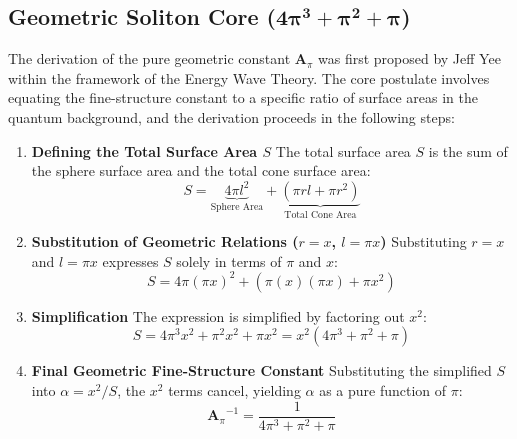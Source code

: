 \documentclass[10pt,a4paper]{article}
\begin{document}
\subsection*{Geometric Soliton Core ($\mathbf{4\pi^{3} + \pi^{2} + \pi}$)}

The derivation of the pure geometric constant $\mathbf{A}_{\pi}$ was first proposed by Jeff Yee \cite{Yee2019alfa} within the framework of the Energy Wave Theory. The core postulate involves equating the fine-structure constant to a specific ratio of surface areas in the quantum background, and the derivation proceeds in the following steps:
\begin{enumerate}[label=\textbf{Step \arabic*:}]
	\item \textbf{Defining the Total Surface Area $S$}
	The total surface area $S$ is the sum of the sphere surface area and the total cone surface area:
	\begin{equation}
		S = \underbrace{4\pi l^{2}}_{\text{Sphere Area}} + \underbrace{(\pi r l + \pi r^{2})}_{\text{Total Cone Area}}
	\end{equation}
	
	\item \textbf{Substitution of Geometric Relations ($r=x$, $l=\pi x$)}
	Substituting $r=x$ and $l=\pi x$ expresses $S$ solely in terms of $\pi$ and $x$:
	\begin{equation}
		S = 4\pi (\pi x)^{2} + (\pi (x) (\pi x) + \pi x^{2})
	\end{equation}
	
	\item \textbf{Simplification}
	The expression is simplified by factoring out $x^2$:
	\begin{equation}
		S = 4\pi^3 x^2 + \pi^2 x^2 + \pi x^{2} = x^{2}(4\pi^{3} + \pi^{2} + \pi)
	\end{equation}
	
	\item \textbf{Final Geometric Fine-Structure Constant}
	Substituting the simplified $S$ into $\alpha = x^2 / S$, the $x^2$ terms cancel, yielding $\alpha$ as a pure function of $\pi$:
	\begin{equation}
		{\mathbf{A}_{\pi}}^{-1} = \frac{1}{4\pi^{3} + \pi^{2} + \pi}
		\label{eq:A_pi}
	\end{equation}
\end{enumerate}
\end{document}
